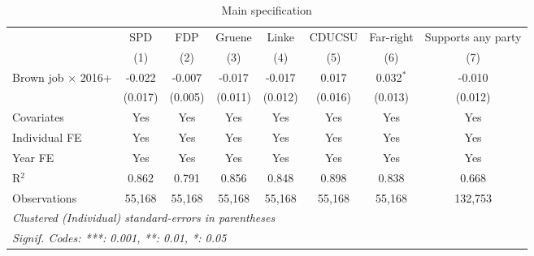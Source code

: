 \begin{table}[htbp]
   \caption{Main specification}
   \centering
   \begin{tabular}{lccccccc}
      \tabularnewline \midrule \midrule
                                & SPD     & FDP     & Gruene  & Linke   & CDUCSU  & Far-right   & Supports any party\\  
                                & (1)     & (2)     & (3)     & (4)     & (5)     & (6)         & (7)\\  
      Brown job $\times$ 2016+  & -0.022  & -0.007  & -0.017  & -0.017  & 0.017   & 0.032$^{*}$ & -0.010\\   
                                & (0.017) & (0.005) & (0.011) & (0.012) & (0.016) & (0.013)     & (0.012)\\   
      Covariates                & Yes     & Yes     & Yes     & Yes     & Yes     & Yes         & Yes\\  
      Individual FE             & Yes     & Yes     & Yes     & Yes     & Yes     & Yes         & Yes\\  
      Year FE                   & Yes     & Yes     & Yes     & Yes     & Yes     & Yes         & Yes\\  
      R$^2$                     & 0.862   & 0.791   & 0.856   & 0.848   & 0.898   & 0.838       & 0.668\\  
      Observations              & 55,168  & 55,168  & 55,168  & 55,168  & 55,168  & 55,168      & 132,753\\  
      \midrule \midrule
      \multicolumn{8}{l}{\emph{Clustered (Individual) standard-errors in parentheses}}\\
      \multicolumn{8}{l}{\emph{Signif. Codes: ***: 0.001, **: 0.01, *: 0.05}}\\
   \end{tabular}
\end{table}



